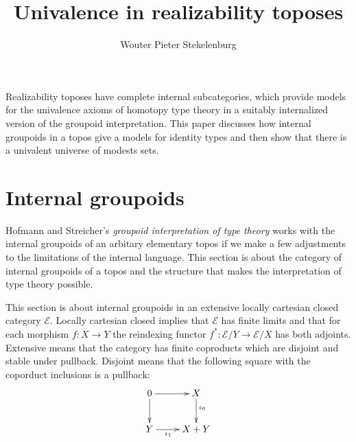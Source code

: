 \documentclass{amsart}
\title{Univalence in realizability toposes}
\author[W. P. Stekelenburg]{Wouter Pieter Stekelenburg}
\theoremstyle{plain}
\theoremstyle{definition}
\newcommand\hide[1]{}
\newcommand\cat\mathcal
\newcommand\set[1]{\left\{#1\right\}}
\begin{document}
\maketitle

Realizability toposes have complete internal subcategories, which provide models for the univalence axioms of homotopy type theory in a suitably internalized version of the groupoid interpretation. This paper discusses how internal groupoids in a topos give a models for identity types and then show that there is a univalent universe of modests sets.


\section{Internal groupoids}
Hofmann and Streicher's \emph{groupoid interpretation of type theory} works with the internal groupoids of an arbitary elementary topos if we make a few adjustments to the limitations of the internal language. This section is about the category of internal groupoids of a topos and the structure that makes the interpretation of type theory possible.

\newcommand\ri{^*}
This section is about internal groupoids in an extensive locally cartesian closed category $\cat E$. Locally cartesian closed implies that $\cat E$ has finite limits and that for each morphism $f:X\to Y$ the reindexing functor $f\ri:\cat E/Y\to\cat E/X$ has both adjoints.%
Extensive means that the category has finite coproducts which are disjoint and stable under pullback. Disjoint means that the following square with the coporduct inclusions is a pullback:
\[\xymatrix{
0\ar[r]\ar[d] & X\ar[d]^(.4){\iota_0}\\
Y\ar[r]_(.4){\iota_1} & X+Y
}\]

\hide{
Toposes have these properties, but are also 

classifier. Elementary toposes automatically are exact, extensive and locally cartesian closed. In fact, for each object $I$ of $\cat E$, the slice $\cat E/I$ is a topos. Each $f:I\to J$ induces a reindexing functor $f\ri:\cat E/J \to \cat E/I$ and this functor has both al left adjoint $\coprod_f$ and a right adjoint $\prod_f$, which means it preserves all limits.
\hide{misschien meteen over assemblies praten?}

Toposes are also Heyting categories, which means that set builder expressions like $\set{x\in X| \phi(x)}$ corresponds to subobjects of $X$. We assume that every topos is equipped with a map which chooses a specific monomorphism $Y\to X$ to represent each set builder expression. When we refer to $\set{x\in X| \phi(x)}$ as an object of $\cat E$ we implicitely apply this map.
}
 
\end{document}
